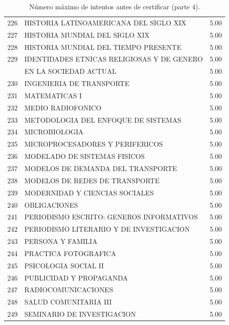 \documentclass[12pt]{article}
\begin{document}
\begin{table}[ht]
{\begin{tabular}{rlr}
  226 & HISTORIA LATINOAMERICANA DEL SIGLO XIX & 5.00 \\ 
  227 & HISTORIA MUNDIAL DEL SIGLO XIX & 5.00 \\ 
  228 & HISTORIA MUNDIAL DEL TIEMPO PRESENTE & 5.00 \\ 
 229 & IDENTIDADES ETNICAS RELIGIOSAS Y DE GENERO & 5.00 \\
  & EN LA SOCIEDAD ACTUAL & 5.00 \\ 
  230 & INGENIERIA DE TRANSPORTE & 5.00 \\ 
  231 & MATEMATICAS I & 5.00 \\ 
  232 & MEDIO RADIOFONICO & 5.00 \\ 
  233 & METODOLOGIA DEL ENFOQUE DE SISTEMAS & 5.00 \\ 
  234 & MICROBIOLOGIA & 5.00 \\ 
  235 & MICROPROCESADORES Y PERIFERICOS & 5.00 \\ 
  236 & MODELADO DE SISTEMAS FISICOS & 5.00 \\ 
  237 & MODELOS DE DEMANDA DEL TRANSPORTE & 5.00 \\ 
  238 & MODELOS DE REDES DE TRANSPORTE & 5.00 \\ 
  239 & MODERNIDAD Y CIENCIAS SOCIALES & 5.00 \\ 
  240 & OBLIGACIONES & 5.00 \\ 
  241 & PERIODISMO ESCRITO: GENEROS INFORMATIVOS & 5.00 \\ 
  242 & PERIODISMO LITERARIO Y DE INVESTIGACION & 5.00 \\ 
  243 & PERSONA Y FAMILIA & 5.00 \\ 
  244 & PRACTICA FOTOGRAFICA & 5.00 \\ 
  245 & PSICOLOGIA SOCIAL II & 5.00 \\ 
  246 & PUBLICIDAD Y PROPAGANDA & 5.00 \\ 
  247 & RADIOCOMUNICACIONES & 5.00 \\ 
  248 & SALUD COMUNITARIA III & 5.00 \\ 
  249 & SEMINARIO DE INVESTIGACION & 5.00 \\ 
   \hline
\end{tabular}}
\caption{\label{Num_Max_Intentos_Cert_4} N\'umero m\'aximo de intentos antes de certificar (parte 4).}

\end{table}
\end{document}
